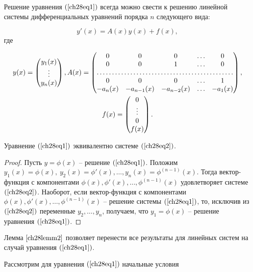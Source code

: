 Решение уравнения $(\ref{ch28eq1})$ всегда можно свести к решению линейной системы дифференциальных уравнений порядка $n$ следующего вида:

\begin{equation} \label{ch28eq2}
y'(x) = A(x)y(x) + f(x),
\end{equation}
где

\begin{multline}
y(x) = \begin{pmatrix}
y_1(x) \\
\vdots \\
y_n(x)
\end{pmatrix},
A(x) = \begin{pmatrix}
0 & 0 & 0 & \ldots & 0 \\
0 & 0 & 1 & \ldots & 0 \\
\hdotsfor{5} \\
0 & 0 & 0 & \ldots & 1 \\
-a_n(x) & -a_{n - 1}(x) & -a_{n - 2}(x) & \ldots & -a_1(x)
\end{pmatrix}, \\
f(x) = \begin{pmatrix}
0 \\
\vdots \\ 
0 \\
f(x)
\end{pmatrix}.
\end{multline}

\begin{lemm} \label{ch28lemm2}
Уравнение $(\ref{ch28eq1})$ эквивалентно системе $(\ref{ch28eq2})$.
\end{lemm}

\begin{proof}
Пусть $y = \phi(x)$ -- решение $(\ref{ch28eq1})$. Положим $y_1(x) = \phi(x), \: y_2(x) = \phi'(x), \ldots, y_n(x) = \phi^{(n - 1)}(x)$. Тогда вектор-функция с компонентами $\phi(x), \phi'(x), \ldots, \phi^{(n - 1)}(x)$ удовлетворяет системе $(\ref{ch28eq2})$. Наоборот, если вектор-функция с компонентами $\phi(x), \phi'(x), \ldots, \phi^{(n - 1)}(x)$ -- решение системы $(\ref{ch28eq1})$, то, исключив из $(\ref{ch28eq2})$ переменные $y_2, \ldots, y_n$, получаем, что $y_1 = \phi(x)$ -- решение уравнения $(\ref{ch28eq1})$.
\end{proof}

Лемма $\ref{ch28lemm2}$ позволяет  перенести все результаты для линейных систем на случай уравнения $(\ref{ch28eq1})$.

Рассмотрим для уравнения $(\ref{ch28eq1})$ начальные условия

